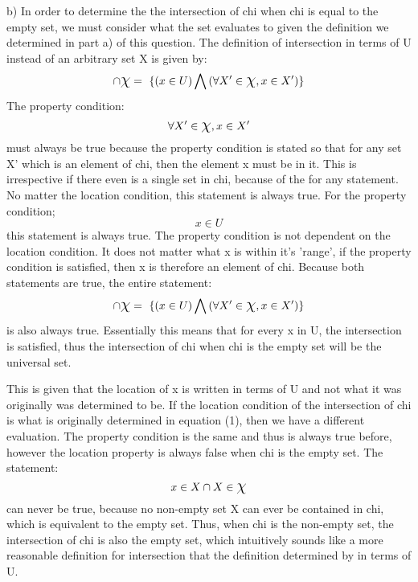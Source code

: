 \documentclass[11pt]{article}
\begin{document}
\begin{enumerate}
b)
\newline  In order to determine the the intersection of chi when chi is equal to the empty set, we must consider what the set evaluates to given the definition we determined in part a) of this question. The definition of intersection in terms of U instead of an arbitrary set X is given by: 
\begin{equation}
        \cap \mbox{\Large$\chi$} = \ \{\left(x  \in  U \right) \bigwedge \left( \forall X' \in \mbox{\Large$\chi$}, x \in X' \right)\}\\ 
\end{equation}
The property condition:
\begin{equation}
    \forall X' \in \mbox{\Large$\chi$}, x \in X'
\end{equation}
must always be true because the property condition is stated so that for any set X' which is an element of chi, then the element x must be in it. This is irrespective if there even is a single set in chi, because of the for any statement. No matter the location condition, this statement is always true. For the property condition; 
\begin{equation}
    x \in U 
\end{equation}
this statement is always true.
The property condition is not dependent on the location condition. It does not matter what x is within it's 'range', if the property condition is satisfied, then x is therefore an element of chi. Because both statements are true, the entire statement: 
\begin{equation}
         \cap \mbox{\Large$\chi$} = \ \{\left(x  \in  U \right) \bigwedge \left( \forall X' \in \mbox{\Large$\chi$}, x \in X' \right)\}\\
\end{equation}
is also always true. Essentially this means that for every x in U, the intersection is satisfied, thus the intersection of chi when chi is the empty set will be the universal set. 

This is given that the location of x is written in terms of U and not what it was originally was determined to be. If the location condition of the intersection of chi is what is originally determined in equation (1), then we have a different evaluation. The property condition is the same and thus is always true  before, however the location property is always false when chi is the empty set. The statement:
\begin{equation}
    x  \in X \cap X \in \mbox{\Large$\chi$} 
\end{equation}
can never be true, because no non-empty set X can ever be contained in chi, which is equivalent to the empty set. Thus, when chi is the non-empty set, the intersection of chi is also the empty set, which intuitively sounds like a more reasonable definition for intersection that the definition determined by in terms of U. 


\end{enumerate}
\end{document}
